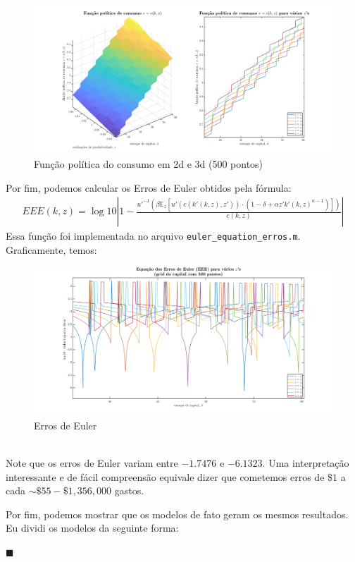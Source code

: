 \documentclass[10pt]{article}
\newcommand*{\QEDA}{\hfill\ensuremath{\blacksquare}}%
\newcommand\E{\mathbb{E}}
\newcommand\0{\mathbf{0}}
\newenvironment{sol}
    {\\[1em] {\color{magenta}\text{Resposta.}}
    }
    {{\color{blue!50!black}\QEDA}}
\begin{document}
\begin{enumerate}[wide]
\begin{sol}
\begin{figure}[htp!]
\centering
\includegraphics[scale=0.3]{consumption_policy_function_brute_force_500.png}
\caption{Função política do consumo em 2d e 3d (500 pontos)}
\label{fig3}
\end{figure}


Por fim, podemos calcular os Erros de Euler obtidos pela fórmula: 
\begin{align*}
EEE(k,z) = \log10 \left| 1 - \frac{u'^{-1}\left(\beta \E_z \left[u'(c(k'(k,z),z')) \cdot \left(1-\delta + \alpha z' k'(k,z)^{\alpha - 1}\right)\right]\right)}{c(k,z)}\right|
\end{align*}
Essa função foi implementada no arquivo \texttt{euler\_equation\_erros.m}. Graficamente, temos:
\begin{figure}[htp!]
\centering
\includegraphics[scale=0.3]{eee_500.png}
\caption{Erros de Euler}
\label{fig4}
\end{figure}\\
Note que os erros de Euler variam entre $-1.7476$ e $-6.1323$. Uma interpretação interessante e de fácil compreensão equivale dizer que cometemos erros de $\$1$ a cada  $\sim \$ 55 - \$ 1,356,000$ gastos.

\newpage

Por fim, podemos mostrar que os modelos de fato geram os mesmos resultados. Eu dividi os modelos da seguinte forma: 


\end{sol}
\end{enumerate}
\end{document}
